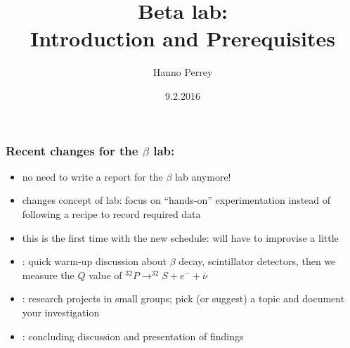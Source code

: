 \documentclass[]{beamer} %
\title[Beta lab]{Beta lab:\\ Introduction and Prerequisites} %
\author{Hanno Perrey} %
\institute[LU] %
{
Lund University\\ %
\medskip
\textit{hanno.perrey@nuclear.lu.se} %
}
\date[Lab Introduction]{9.2.2016} %
\begin{document}




\begin{frame}
  \frametitle{Recent changes for the $\beta$ lab:}

  \begin{itemize}
  \item no need to write a report for the $\beta$ lab anymore!
  \item changes concept of lab: focus on ``hands-on'' experimentation
    instead of following a recipe to record required data
  \item this is the first time with the new schedule: will have to
    improvise a little
  \end{itemize}

  \begin{itemize}
  \item {}: quick warm-up discussion about $\beta$ decay,
    scintillator detectors, then we measure the $Q$ value of
    $^{32}P\rightarrow ^{32}S + e^- + \bar{\nu}$
  \item {}: research projects in small groups; pick (or
    suggest) a topic and document your investigation
  \item {}: concluding discussion and presentation of findings
  \end{itemize}
\end{frame}
\end{document}
